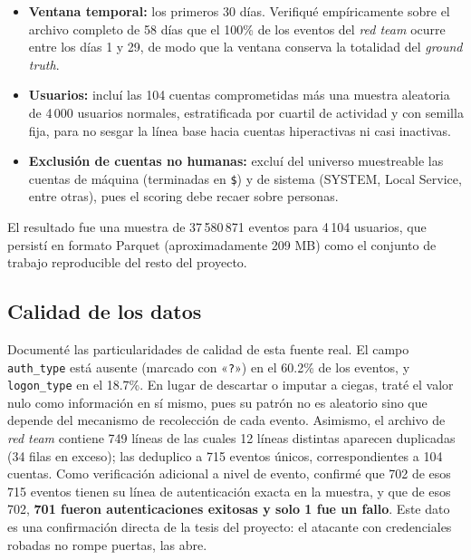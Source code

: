 \documentclass[12pt, a4paper]{article}
\begin{document}
\begin{itemize}[leftmargin=1.5cm]
  \item \textbf{Ventana temporal:} los primeros 30 días. Verifiqué empíricamente sobre el archivo
        completo de 58 días que el 100\% de los eventos del \textit{red team} ocurre entre los días 1
        y 29, de modo que la ventana conserva la totalidad del \textit{ground truth}.
  \item \textbf{Usuarios:} incluí las 104 cuentas comprometidas más una muestra aleatoria de 4\,000
        usuarios normales, estratificada por cuartil de actividad y con semilla fija, para no sesgar
        la línea base hacia cuentas hiperactivas ni casi inactivas.
  \item \textbf{Exclusión de cuentas no humanas:} excluí del universo muestreable las cuentas de
        máquina (terminadas en \texttt{\$}) y de sistema (SYSTEM, Local Service, entre otras), pues
        el scoring debe recaer sobre personas.
\end{itemize}

El resultado fue una muestra de 37\,580\,871 eventos para 4\,104 usuarios, que persistí en formato
Parquet (aproximadamente 209 MB) como el conjunto de trabajo reproducible del resto del proyecto.

\subsection{Calidad de los datos}

Documenté las particularidades de calidad de esta fuente real. El campo \texttt{auth\_type} está
ausente (marcado con «\texttt{?}») en el 60.2\% de los eventos, y \texttt{logon\_type} en el 18.7\%.
En lugar de descartar o imputar a ciegas, traté el valor nulo como información en sí mismo, pues su
patrón no es aleatorio sino que depende del mecanismo de recolección de cada evento. Asimismo, el
archivo de \textit{red team} contiene 749 líneas de las cuales 12 líneas distintas aparecen
duplicadas (34 filas en exceso); las deduplico a 715 eventos únicos, correspondientes a 104 cuentas.
Como verificación adicional a nivel de evento, confirmé que 702 de esos 715 eventos tienen su línea
de autenticación exacta en la muestra, y que de esos 702, \textbf{701 fueron autenticaciones
exitosas y solo 1 fue un fallo}. Este dato es una confirmación directa de la tesis del proyecto: el
atacante con credenciales robadas no rompe puertas, las abre.

\end{document}
